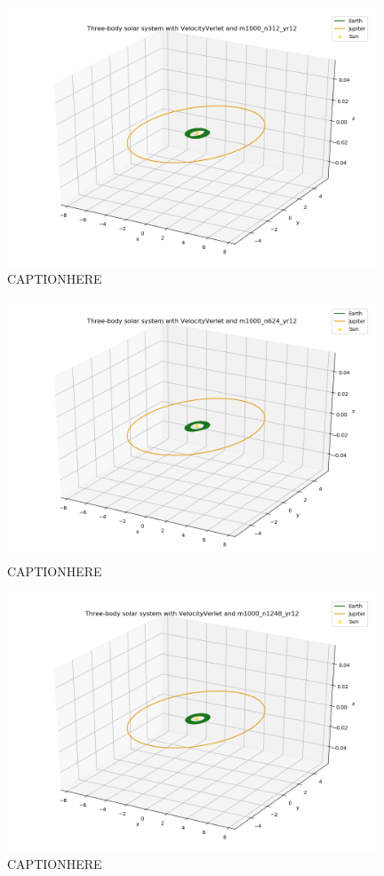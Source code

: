 \documentclass{article}
\begin{document}
    \begin{figure}[H]
        \centering
        \includegraphics[width = 11cm]{img/plot3D_S_E_J_V_m1000_n312_yr12.png}
        \caption{CAPTIONHERE}
        \label{fig:plot3D_S_E_J_V_m1000_n312_yr12}
    \end{figure}

    \begin{figure}[H]
        \centering
        \includegraphics[width = 11cm]{img/plot3D_S_E_J_V_m1000_n624_yr12.png}
        \caption{CAPTIONHERE}
        \label{fig:plot3D_S_E_J_V_m1000_n624_yr12}
    \end{figure}

    \begin{figure}[H]
        \centering
        \includegraphics[width = 11cm]{img/plot3D_S_E_J_V_m1000_n1248_yr12.png}
        \caption{CAPTIONHERE}
        \label{fig:plot3D_S_E_J_V_m1000_n1248_yr12}
    \end{figure}
\end{document}
